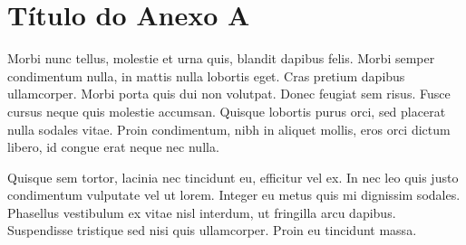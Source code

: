 %

\chapter{Título do Anexo A}

Morbi nunc tellus, molestie et urna quis, blandit dapibus felis. Morbi semper condimentum nulla, in mattis nulla lobortis eget. Cras pretium dapibus ullamcorper. Morbi porta quis dui non volutpat. Donec feugiat sem risus. Fusce cursus neque quis molestie accumsan. Quisque lobortis purus orci, sed placerat nulla sodales vitae. Proin condimentum, nibh in aliquet mollis, eros orci dictum libero, id congue erat neque nec nulla.

Quisque sem tortor, lacinia nec tincidunt eu, efficitur vel ex. In nec leo quis justo condimentum vulputate vel ut lorem. Integer eu metus quis mi dignissim sodales. Phasellus vestibulum ex vitae nisl interdum, ut fringilla arcu dapibus. Suspendisse tristique sed nisi quis ullamcorper. Proin eu tincidunt massa.
